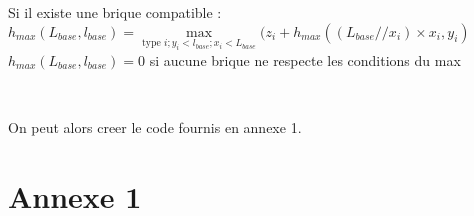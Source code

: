 \documentclass[
  paper=a4,
  ,captions=tableheading
]{scrartcl}
\begin{document}
Si il existe une brique compatible :\\
\(h_{max}(L_{base}, l_{base}) = \underset{\textrm{type } i ; y_i < l_{base} ; x_i < L_{base}} {\max}( z_i + h_{max}( (L_{base}//x_i ) \times x_i, y_i)\)\\
\(h_{max}(L_{base}, l_{base}) = 0\) si aucune brique ne respecte les
conditions du max

~

On peut alors creer le code fournis en annexe 1.

\hypertarget{annexe-1}{%
\section{Annexe 1}\label{annexe-1}}


\end{document}
